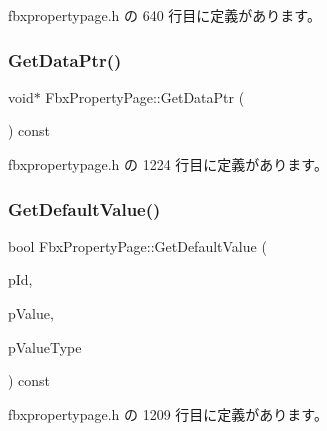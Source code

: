  fbxpropertypage.\+h の 640 行目に定義があります。

\mbox{\label{class_fbx_property_page_a6ad972f243413eb30ad74a0c0965db36}} 
\subsubsection{\texorpdfstring{Get\+Data\+Ptr()}{GetDataPtr()}}
{\footnotesize\ttfamily void$\ast$ Fbx\+Property\+Page\+::\+Get\+Data\+Ptr (\begin{DoxyParamCaption}{ }\end{DoxyParamCaption}) const\hspace{0.3cm}{\ttfamily [inline]}}



 fbxpropertypage.\+h の 1224 行目に定義があります。

\mbox{\label{class_fbx_property_page_a808492bc7526ffc1ad1abb7364cbd918}} 
\subsubsection{\texorpdfstring{Get\+Default\+Value()}{GetDefaultValue()}}
{\footnotesize\ttfamily bool Fbx\+Property\+Page\+::\+Get\+Default\+Value (\begin{DoxyParamCaption}\item[{\hyperlink{fbxtypes_8h_a088fa96de3b0b3ea69f0f6afef525dfb}{Fbx\+Int}}]{p\+Id,  }\item[{void $\ast$}]{p\+Value,  }\item[{\hyperlink{fbxpropertytypes_8h_a73913a5ddfb20e57c6f25e9e6784bd92}{E\+Fbx\+Type}}]{p\+Value\+Type }\end{DoxyParamCaption}) const\hspace{0.3cm}{\ttfamily [inline]}}



 fbxpropertypage.\+h の 1209 行目に定義があります。

\mbox{\label{class_fbx_property_page_af13a1f816102911f882837c77caa4d38}} 
